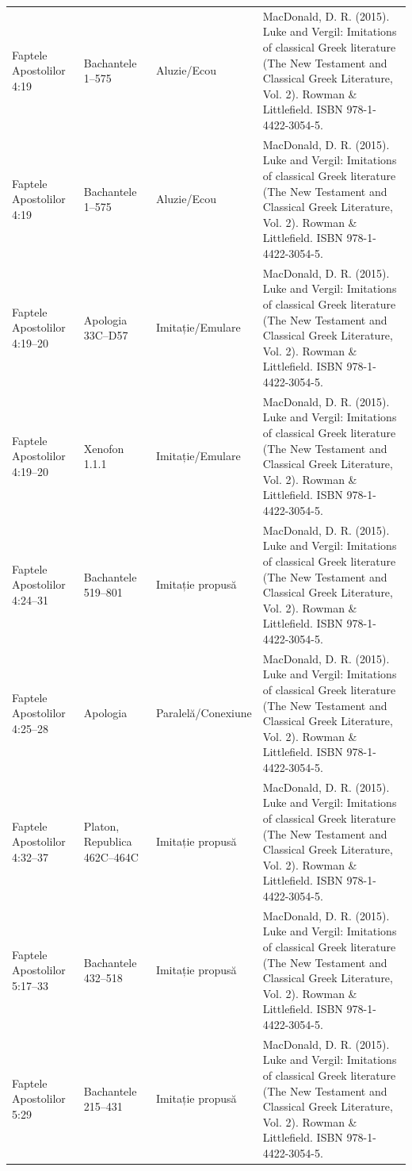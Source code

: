 \documentclass[12pt,a4paper,twoside,openany]{book}
\begin{document}
\begin{longtable}{L{1.4cm}L{1.7cm}L{3.1cm}L{8.4cm}}
Faptele Apostolilor 4:19 & Bachantele 1–575 & Aluzie/Ecou & MacDonald, D. R. (2015). Luke and Vergil: Imitations of classical Greek literature (The New Testament and Classical Greek Literature, Vol. 2). Rowman \& Littlefield. ISBN 978-1-4422-3054-5. \\
Faptele Apostolilor 4:19 & Bachantele 1–575 & Aluzie/Ecou & MacDonald, D. R. (2015). Luke and Vergil: Imitations of classical Greek literature (The New Testament and Classical Greek Literature, Vol. 2). Rowman \& Littlefield. ISBN 978-1-4422-3054-5. \\
Faptele Apostolilor 4:19–20 & Apologia 33C–D57 & Imitație/Emulare & MacDonald, D. R. (2015). Luke and Vergil: Imitations of classical Greek literature (The New Testament and Classical Greek Literature, Vol. 2). Rowman \& Littlefield. ISBN 978-1-4422-3054-5. \\
Faptele Apostolilor 4:19–20 & Xenofon 1.1.1 & Imitație/Emulare & MacDonald, D. R. (2015). Luke and Vergil: Imitations of classical Greek literature (The New Testament and Classical Greek Literature, Vol. 2). Rowman \& Littlefield. ISBN 978-1-4422-3054-5. \\
Faptele Apostolilor 4:24–31 & Bachantele 519–801 & Imitație propusă & MacDonald, D. R. (2015). Luke and Vergil: Imitations of classical Greek literature (The New Testament and Classical Greek Literature, Vol. 2). Rowman \& Littlefield. ISBN 978-1-4422-3054-5. \\
Faptele Apostolilor 4:25–28 & Apologia & Paralelă/Conexiune & MacDonald, D. R. (2015). Luke and Vergil: Imitations of classical Greek literature (The New Testament and Classical Greek Literature, Vol. 2). Rowman \& Littlefield. ISBN 978-1-4422-3054-5. \\
Faptele Apostolilor 4:32–37 & Platon, Republica 462C–464C & Imitație propusă & MacDonald, D. R. (2015). Luke and Vergil: Imitations of classical Greek literature (The New Testament and Classical Greek Literature, Vol. 2). Rowman \& Littlefield. ISBN 978-1-4422-3054-5. \\
Faptele Apostolilor 5:17–33 & Bachantele 432–518 & Imitație propusă & MacDonald, D. R. (2015). Luke and Vergil: Imitations of classical Greek literature (The New Testament and Classical Greek Literature, Vol. 2). Rowman \& Littlefield. ISBN 978-1-4422-3054-5. \\
Faptele Apostolilor 5:29 & Bachantele 215–431 & Imitație propusă & MacDonald, D. R. (2015). Luke and Vergil: Imitations of classical Greek literature (The New Testament and Classical Greek Literature, Vol. 2). Rowman \& Littlefield. ISBN 978-1-4422-3054-5. \\

\end{longtable}
\end{document}
